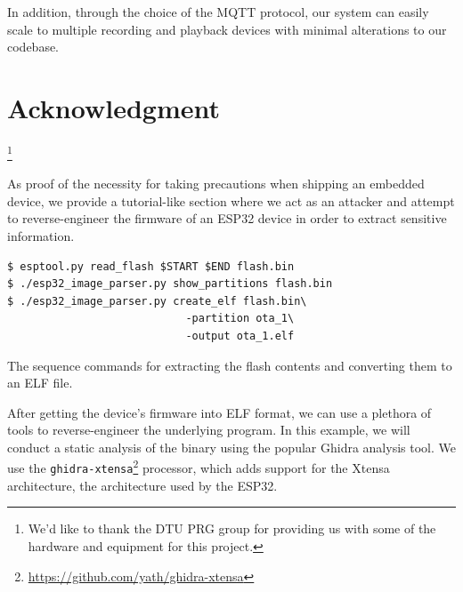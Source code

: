 \documentclass[conference]{IEEEtran}
\begin{document}
In addition, through the choice of the MQTT protocol, our system can easily scale to multiple recording and playback devices
with minimal alterations to our codebase.

\section*{Acknowledgment}

\thanks{We'd like to thank the DTU PRG group for providing us with some of the hardware and equipment for this project.}




\appendices
{}

\label{appendix:reverse_engineering}

As proof of the necessity for taking precautions when shipping an embedded device, 
we provide a tutorial-like section where we act as an attacker and attempt to reverse-engineer the firmware of an ESP32
device in order to extract sensitive information.

\begin{listing}[h]
\begin{verbatim}
$ esptool.py read_flash $START $END flash.bin
$ ./esp32_image_parser.py show_partitions flash.bin
$ ./esp32_image_parser.py create_elf flash.bin\
                            -partition ota_1\
                            -output ota_1.elf
\end{verbatim}
\caption{The sequence commands for extracting the flash contents and converting them to an ELF file.}
\end{listing}

After getting the device's firmware into ELF format, we can use a plethora of tools 
to reverse-engineer the underlying program. 
In this example, we will conduct a static analysis of the binary using the popular Ghidra\cite{Ghidra, GhidraBook} analysis tool.
We use the \texttt{ghidra-xtensa}\footnote{\url{https://github.com/yath/ghidra-xtensa}} processor,
which adds support for the Xtensa architecture, the architecture used by the ESP32.
\end{document}
